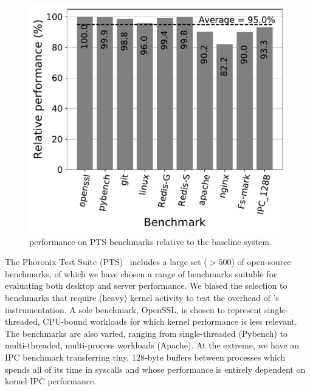 \documentclass[letterpaper,twocolumn,10pt, anonymous]{article}
\begin{document}
\begin{figure}[]
  \includegraphics[width=\linewidth]{img/pts_performance.pdf}
  \caption{\tiktok performance on PTS benchmarks relative to the baseline system.}
  \label{fig:pts_performance}
\end{figure}

The Phoronix Test Suite (PTS)~\cite{pts} includes a large set ($>500$) of 
open-source benchmarks, of which we have chosen a range of benchmarks 
suitable for evaluating both desktop and server performance.
We biased the selection to benchmarks that require (heavy) kernel activity to
test the overhead of \tiktok's instrumentation.
A sole benchmark, OpenSSL, is chosen to represent single-threaded, 
CPU-bound workloads for which kernel performance is less relevant.
The benchmarks are also varied, ranging from single-threaded (Pybench) to 
multi-threaded, multi-process workloads (Apache).
At the extreme, we have an IPC benchmark transferring tiny, 128-byte 
buffers between processes which spends all of its time in syscalls
and whose performance is entirely dependent on kernel IPC performance.
\end{document}
